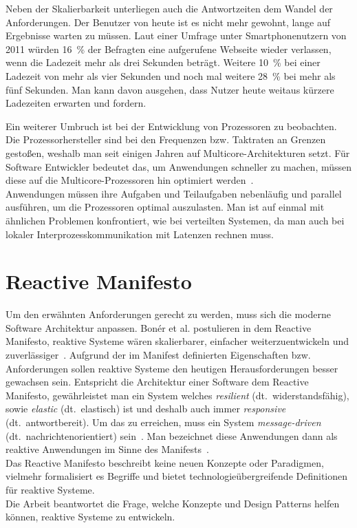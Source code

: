Neben der Skalierbarkeit unterliegen auch die Antwortzeiten dem Wandel der Anforderungen. Der Benutzer von heute ist es nicht mehr gewohnt, lange auf Ergebnisse warten zu müssen. Laut einer Umfrage unter Smartphonenutzern von 2011 würden 16~\% der Befragten eine aufgerufene Webseite wieder verlassen, wenn die Ladezeit mehr als drei Sekunden beträgt. Weitere 10~\% bei einer Ladezeit von mehr als vier Sekunden und noch mal weitere 28~\% bei mehr als fünf Sekunden\footnotemark[5]. Man kann davon ausgehen, dass Nutzer heute weitaus kürzere Ladezeiten erwarten und fordern.\\


Ein weiterer Umbruch ist bei der Entwicklung von Prozessoren zu beobachten. Die Prozessorhersteller sind bei den Frequenzen bzw. Taktraten an Grenzen gestoßen, weshalb man seit einigen Jahren auf Multicore-Architekturen setzt. Für Software Entwickler bedeutet das, um Anwendungen schneller zu machen, müssen diese auf die Multicore-Prozessoren hin optimiert werden~\cite[S. 15]{butcher_seven_2014}.\\Anwendungen müssen ihre Aufgaben und Teilaufgaben nebenläufig und parallel ausführen, um die Prozessoren optimal auszulasten. Man ist auf einmal mit ähnlichen Problemen konfrontiert, wie bei verteilten Systemen, da man auch bei lokaler Interprozesskommunikation mit Latenzen rechnen muss.

\section{Reactive Manifesto}
Um den erwähnten Anforderungen gerecht zu werden, muss sich die moderne Software Architektur anpassen. Bonér et al. postulieren in dem Reactive Manifesto, reaktive Systeme wären skalierbarer, einfacher weiterzuentwickeln und zuverlässiger~\cite{boner_reactive_2014}. Aufgrund der im Manifest definierten Eigenschaften bzw. Anforderungen sollen reaktive Systeme den heutigen Herausforderungen besser gewachsen sein. Entspricht die Architektur einer Software dem Reactive Manifesto, gewährleistet man ein System welches \textit{resilient} (dt.~widerstandsfähig), sowie \textit{elastic} (dt.~elastisch) ist und deshalb auch immer \textit{responsive} (dt.~antwortbereit). Um das zu erreichen, muss ein System \textit{message-driven} (dt.~nachrichtenorientiert) sein~\cite[S.~5]{vernon_reactive_2016}. Man bezeichnet diese Anwendungen dann als reaktive Anwendungen im Sinne des Manifests~\cite{boner_reactive_2014}.\\
Das Reactive Manifesto beschreibt keine neuen Konzepte oder Paradigmen, vielmehr formalisiert es Begriffe und bietet technologieübergreifende Definitionen für reaktive Systeme.\\

Die Arbeit beantwortet die Frage, welche Konzepte und Design Patterns helfen können, reaktive Systeme zu entwickeln.
